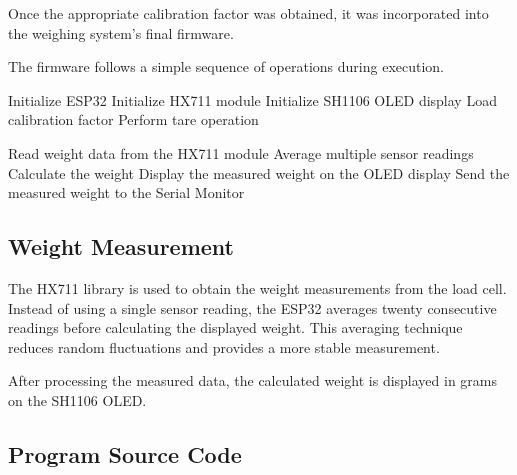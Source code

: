 Once the appropriate calibration factor was obtained, it was incorporated into the weighing system's final firmware.

The firmware follows a simple sequence of operations during execution.

\begin{algorithm}[H]
\caption{Firmware Execution}
\begin{algorithmic}[1]

    \State Initialize ESP32
    \State Initialize HX711 module
    \State Initialize SH1106 OLED display
    \State Load calibration factor
    \State Perform tare operation
\EndFunction

    \State Read weight data from the HX711 module
    \State Average multiple sensor readings
    \State Calculate the weight
    \State Display the measured weight on the OLED display
    \State Send the measured weight to the Serial Monitor
\EndFunction

\end{algorithmic}
\end{algorithm}




\subsection{Weight Measurement}

The HX711 library is used to obtain the weight measurements from the load cell. Instead of using a single sensor reading, the ESP32 averages twenty consecutive readings before calculating the displayed weight. This averaging technique reduces random fluctuations and provides a more stable measurement.

After processing the measured data, the calculated weight is displayed in grams on the SH1106 OLED.


\subsection{Program Source Code}

